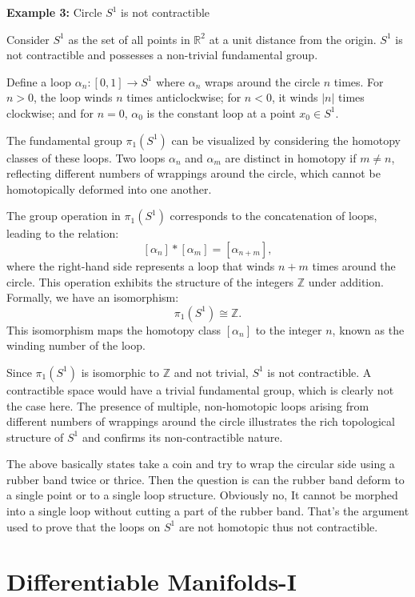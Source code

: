 \documentclass{article}
\begin{document}
\textbf{Example 3:} Circle $S^1$ is not contractible 

Consider \( S^1 \) as the set of all points in \( \mathbb{R}^2 \) at a unit distance from the origin. \( S^1 \) is not contractible and possesses a non-trivial fundamental group.

Define a loop \( \alpha_n: [0,1] \rightarrow S^1 \) where \( \alpha_n \) wraps around the circle \( n \) times. For \( n > 0 \), the loop winds \( n \) times anticlockwise; for \( n < 0 \), it winds \( |n| \) times clockwise; and for \( n = 0 \), \( \alpha_0 \) is the constant loop at a point \( x_0 \in S^1 \).

The fundamental group \( \pi_1(S^1) \) can be visualized by considering the homotopy classes of these loops. Two loops \( \alpha_n \) and \( \alpha_m \) are distinct in homotopy if \( m \neq n \), reflecting different numbers of wrappings around the circle, which cannot be homotopically deformed into one another.

The group operation in \( \pi_1(S^1) \) corresponds to the concatenation of loops, leading to the relation:
\[
[\alpha_n] * [\alpha_m] = [\alpha_{n+m}],
\]
where the right-hand side represents a loop that winds \( n+m \) times around the circle. This operation exhibits the structure of the integers \( \mathbb{Z} \) under addition. Formally, we have an isomorphism:
\[
\pi_1(S^1) \cong \mathbb{Z}.
\]
This isomorphism maps the homotopy class \( [\alpha_n] \) to the integer \( n \), known as the winding number of the loop.

Since \( \pi_1(S^1) \) is isomorphic to \( \mathbb{Z} \) and not trivial, \( S^1 \) is not contractible. A contractible space would have a trivial fundamental group, which is clearly not the case here. The presence of multiple, non-homotopic loops arising from different numbers of wrappings around the circle illustrates the rich topological structure of \( S^1 \) and confirms its non-contractible nature.

The above basically states take a coin and try to wrap the circular side using a rubber band twice or thrice. Then the question is can the rubber band deform to a single point or to a single loop structure. Obviously no, It cannot be morphed into a single loop without cutting a part of the rubber band. That's the argument used to prove that the loops on $S^1$ are not homotopic thus not contractible. 

\section{Differentiable Manifolds-I}
\end{document}

